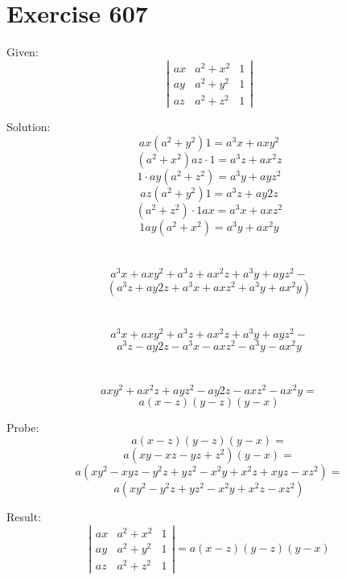 \documentclass[a4paper, 10pt]{scrartcl}
\begin{document}
\section{Exercise 607}

Given:
\[
\left|
    \begin{array}{ccc}
    ax & a^{2} + x^{2} & 1\\
    ay & a^{2} + y^{2} & 1\\
    az & a^{2} + z^{2} & 1
    \end{array}
\right|
\]

Solution:
\[
ax(a^{2} + y^{2})1 = a^{3}x + axy^{2}
\]
\[
(a^{2} + x^{2})az\cdot1 = a^{3}z + ax^{2}z
\]
\[
1\cdot ay(a^{2} + z^{2}) = a^{3}y + ayz^{2}
\]
\[
az(a^{2} + y^{2})1 = a^{3}z + ay{2}z
\]
\[
(a^{2} + z^{2})\cdot 1 ax = a^{3}x + axz^{2}
\]
\[
1ay(a^{2} + x^{2}) = a^{3}y + ax^{2}y
\]
\\
\\
\[
a^{3}x + axy^{2} + a^{3}z + ax^{2}z + a^{3}y + ayz^{2} -
\]
\[
(a^{3}z + ay{2}z + a^{3}x + axz^{2} + a^{3}y + ax^{2}y)
\]
\\
\\
\[
a^{3}x + axy^{2} + a^{3}z + ax^{2}z + a^{3}y + ayz^{2} -
\]
\[
a^{3}z - ay{2}z - a^{3}x - axz^{2} - a^{3}y - ax^{2}y
\]
\\
\\
\[
axy^{2} + ax^{2}z + ayz^{2} - ay{2}z - axz^{2} - ax^{2}y =
\]
\[
a(x - z)(y - z)(y - x)
\]

Probe:
\[
a(x - z)(y - z)(y - x) =
\]
\[
a(xy - xz - yz + z^{2})(y - x) =
\]
\[
a(xy^{2} - xyz - y^{2}z + yz^{2} - x^{2}y + x^{2}z + xyz - xz^{2}) =
\]
\[
a(xy^{2} - y^{2}z + yz^{2} - x^{2}y + x^{2}z - xz^{2})
\]

Result:
\[
\left|
    \begin{array}{ccc}
    ax & a^{2} + x^{2} & 1\\
    ay & a^{2} + y^{2} & 1\\
    az & a^{2} + z^{2} & 1
    \end{array}
\right| = a(x - z)(y - z)(y - x)
\]
\end{document}
